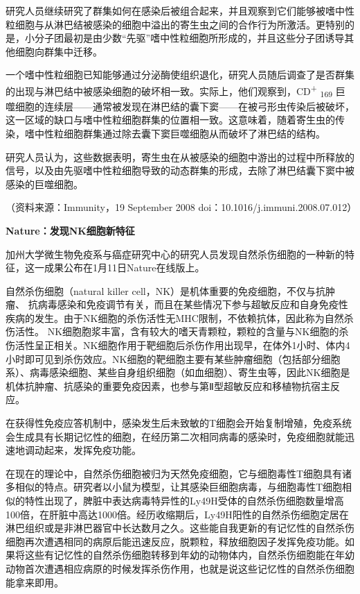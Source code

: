 研究人员继续研究了群集如何在感染后被组合起来，并且观察到它们能够被嗜中性粒细胞与从淋巴结被感染的细胞中溢出的寄生虫之间的合作行为所激活。更特别的是，小分子团最初是由少数“先驱”嗜中性粒细胞所形成的，并且这些分子团诱导其他细胞向群集中迁移。

一个嗜中性粒细胞已知能够通过分泌酶使组织退化，研究人员随后调查了是否群集的出现与淋巴结中被感染细胞的破坏相一致。实际上，他们观察到，CD\textsuperscript{+}
\textsubscript{169}
巨噬细胞的连续层------通常被发现在淋巴结的囊下窦------在被弓形虫传染后被破坏，这一区域的缺口与嗜中性粒细胞群集的位置相一致。这意味着，随着寄生虫的传染，嗜中性粒细胞群集通过除去囊下窦巨噬细胞从而破坏了淋巴结的结构。

研究人员认为，这些数据表明，寄生虫在从被感染的细胞中游出的过程中所释放的信号，以及由先驱嗜中性粒细胞导致的动态群集的形成，去除了淋巴结囊下窦中被感染的巨噬细胞。

（资料来源：Immunity，19 September 2008
doi：10.1016/j.immuni.2008.07.012）

\begin{center}
    \textbf{\Large Nature：发现NK细胞新特征}
\end{center}

加州大学微生物免疫系与癌症研究中心的研究人员发现自然杀伤细胞的一种新的特征，这一成果公布在1月11日Nature在线版上。

自然杀伤细胞（natural killer
cell，NK）是机体重要的免疫细胞，不仅与抗肿瘤、
抗病毒感染和免疫调节有关，而且在某些情况下参与超敏反应和自身免疫性疾病的发生。由于NK细胞的杀伤活性无MHC限制，不依赖抗体，因此称为自然杀伤活性。
NK细胞胞浆丰富，含有较大的嗜天青颗粒，颗粒的含量与NK细胞的杀伤活性呈正相关。NK细胞作用于靶细胞后杀伤作用出现早，在体外1小时、体内4小时即可见到杀伤效应。NK细胞的靶细胞主要有某些肿瘤细胞（包括部分细胞系）、病毒感染细胞、某些自身组织细胞（如血细胞）、寄生虫等，因此NK细胞是机体抗肿瘤、抗感染的重要免疫因素，也参与第Ⅱ型超敏反应和移植物抗宿主反应。

在获得性免疫应答机制中，感染发生后未致敏的T细胞会开始复制增殖，免疫系统会生成具有长期记忆性的细胞，在经历第二次相同病毒的感染时，免疫细胞就能迅速地调动起来，发挥免疫功能。

在现在的理论中，自然杀伤细胞被归为天然免疫细胞，它与细胞毒性T细胞具有诸多相似的特点。研究者以小鼠为模型，让其感染巨细胞病毒，与细胞毒性T细胞相似的特性出现了，脾脏中表达病毒特异性的Ly49H受体的自然杀伤细胞数量增高100倍，在肝脏中高达1000倍。经历收缩期后，Ly49H阳性的自然杀伤细胞定居在淋巴组织或是非淋巴器官中长达数月之久。这些能自我更新的有记忆性的自然杀伤细胞再次遭遇相同的病原后能迅速反应，脱颗粒，释放细胞因子发挥免疫功能。如果将这些有记忆性的自然杀伤细胞转移到年幼的动物体内，自然杀伤细胞能在年幼动物首次遭遇相应病原的时候发挥杀伤作用，也就是说这些记忆性的自然杀伤细胞能拿来即用。

